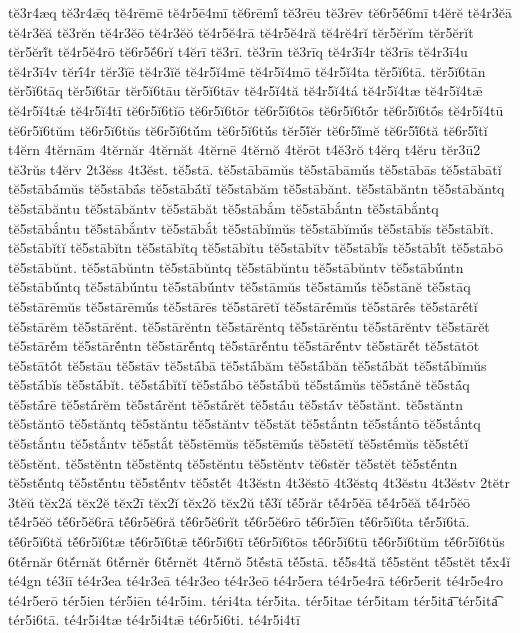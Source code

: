 {tĕ3r4æq
tĕ3r4ǣq
tĕ4rēmē
tĕ4r5ē4mī
tĕ6rēmĭ́
tĕ3rēu
tĕ3rēv
tĕ6r5ḗ6mī
t4ĕrĕ
tĕ4r3ĕā
tĕ4r3ĕă
tĕ3rĕn
tĕ4r3ĕō
tĕ4r3ĕŏ
tĕ4r5ĕ4rā
tĕ4r5ĕ4ră
tĕ4rĕ4rĭ
tĕr5ĕrĭm
tĕr5ĕrĭt
tĕr5ĕrĭ́t
tĕ4r5ĕ4rō
tĕ6r5ĕ́6rĭ
t4ĕrī
tĕ3rī.
tĕ3rīn
tĕ3rīq
tĕ4r3ī4r
tĕ3rīs
tĕ4r3ī4u
tĕ4r3ī4v
tĕrī́4r
tĕr3ĭē
tĕ4r3ĭĕ
tĕ4r5ĭ4mē
tĕ4r5ĭ4mō
tĕ4r5ĭ4ta
tĕr5ĭ6tā.
tĕr5ĭ6tān
tĕr5ĭ6tāq
tĕr5ĭ6tār
tĕr5ĭ6tāu
tĕr5ĭ6tāv
tĕ4r5ĭ4tă
tĕ4r5ĭ4tá
tĕ4r5ĭ4tæ
tĕ4r5ĭ4tǣ
tĕ4r5ĭ4tǽ
tĕ4r5ĭ4tī
tĕ6r5ĭ6tĭō
tĕ6r5ĭ6tōr
tĕ6r5ĭ6tōs
tĕ6r5ĭ6tṓr
tĕ6r5ĭ6tṓs
tĕ4r5ĭ4tū
tĕ6r5ĭ6tŭm
tĕ6r5ĭ6tŭs
tĕ6r5ĭ6tŭ́m
tĕ6r5ĭ6tŭ́s
tĕr5ĭ́ĕr
tĕ6r5ĭ́mĕ
tĕ6r5ĭ́6tă
tĕ6r5ĭ́tĭ
t4ĕrn
4tĕrnām
4tĕrnăr
4tĕrnăt
4tĕrnē
4tĕrnŏ
4tĕrōt
t4ĕ3rŏ
t4ĕrq
t4ĕru
tĕr3ū2
tĕ3rŭs
t4ĕrv
2t3ĕss
4t3ĕst.
tĕ5stā.
tĕ5stābāmŭs
tĕ5stābāmŭ́s
tĕ5stābās
tĕ5stābātĭ
tĕ5stābā́mŭs
tĕ5stābā́s
tĕ5stābā́tĭ
tĕ5stābăm
tĕ5stābănt.
tĕ5stābăntn
tĕ5stābăntq
tĕ5stābăntu
tĕ5stābăntv
tĕ5stābăt
tĕ5stābắm
tĕ5stābắntn
tĕ5stābắntq
tĕ5stābắntu
tĕ5stābắntv
tĕ5stābắt
tĕ5stābĭmŭs
tĕ5stābĭmŭ́s
tĕ5stābĭs
tĕ5stābĭt.
tĕ5stābĭtĭ
tĕ5stābĭtn
tĕ5stābĭtq
tĕ5stābĭtu
tĕ5stābĭtv
tĕ5stābĭ́s
tĕ5stābĭ́t
tĕ5stābō
tĕ5stābŭnt.
tĕ5stābŭntn
tĕ5stābŭntq
tĕ5stābŭntu
tĕ5stābŭntv
tĕ5stābŭ́ntn
tĕ5stābŭ́ntq
tĕ5stābŭ́ntu
tĕ5stābŭ́ntv
tĕ5stāmŭs
tĕ5stāmŭ́s
tĕ5stānĕ
tĕ5stāq
tĕ5stārēmŭs
tĕ5stārēmŭ́s
tĕ5stārēs
tĕ5stārētĭ
tĕ5stārḗmŭs
tĕ5stārḗs
tĕ5stārḗtĭ
tĕ5stārĕm
tĕ5stārĕnt.
tĕ5stārĕntn
tĕ5stārĕntq
tĕ5stārĕntu
tĕ5stārĕntv
tĕ5stārĕt
tĕ5stārĕ́m
tĕ5stārĕ́ntn
tĕ5stārĕ́ntq
tĕ5stārĕ́ntu
tĕ5stārĕ́ntv
tĕ5stārĕ́t
tĕ5stātōt
tĕ5stātṓt
tĕ5stāu
tĕ5stāv
tĕ5stā́bā
tĕ5stā́băm
tĕ5stā́băn
tĕ5stā́băt
tĕ5stā́bĭmŭs
tĕ5stā́bĭs
tĕ5stā́bĭt.
tĕ5stā́bĭtĭ
tĕ5stā́bō
tĕ5stā́bŭ
tĕ5stā́mŭs
tĕ5stā́nĕ
tĕ5stā́q
tĕ5stā́rē
tĕ5stā́rĕm
tĕ5stā́rĕnt
tĕ5stā́rĕt
tĕ5stā́u
tĕ5stā́v
tĕ5stănt.
tĕ5stăntn
tĕ5stăntō
tĕ5stăntq
tĕ5stăntu
tĕ5stăntv
tĕ5stăt
tĕ5stắntn
tĕ5stắntō
tĕ5stắntq
tĕ5stắntu
tĕ5stắntv
tĕ5stắt
tĕ5stēmŭs
tĕ5stēmŭ́s
tĕ5stētĭ
tĕ5stḗmŭs
tĕ5stḗtĭ
tĕ5stĕnt.
tĕ5stĕntn
tĕ5stĕntq
tĕ5stĕntu
tĕ5stĕntv
tĕ6stĕr
tĕ5stĕt
tĕ5stĕ́ntn
tĕ5stĕ́ntq
tĕ5stĕ́ntu
tĕ5stĕ́ntv
tĕ5stĕ́t
4t3ĕstn
4t3ĕstō
4t3ĕstq
4t3ĕstu
4t3ĕstv
2tĕtr
3tĕŭ
tĕx2ă
tĕx2ĕ
tĕx2ī
tĕx2ĭ
tĕx2ŏ
tĕx2ŭ
tĕ́3ĭ
tĕ́5răr
tĕ́4r5ĕā
tĕ́4r5ĕă
tĕ́4r5ĕō
tĕ́4r5ĕŏ
tĕ́6r5ĕ6rā
tĕ́6r5ĕ6ră
tĕ́6r5ĕ6rĭt
tĕ́6r5ĕ6rō
tĕ́6r5ĭēn
tĕ́6r5ĭ6ta
tĕ́r5ĭ6tā.
tĕ́6r5ĭ6tă
tĕ́6r5ĭ6tæ
tĕ́6r5ĭ6tǣ
tĕ́6r5ĭ6tī
tĕ́6r5ĭ6tōs
tĕ́6r5ĭ6tū
tĕ́6r5ĭ6tŭm
tĕ́6r5ĭ6tŭs
6tĕ́rnăr
6tĕ́rnăt
6tĕ́rnĕr
6tĕ́rnĕt
4tĕ́rnŏ
5tĕ́stā
tĕ́5stā.
tĕ́5s4tă
tĕ́5stĕnt
tĕ́5stĕt
tĕ́x4ĭ
té4gn
té3iī
té4r3ea
té4r3eā
té4r3eo
té4r3eō
té4r5era
té4r5e4rā
té6r5erit
té4r5e4ro
té4r5erō
tér5ien
tér5iēn
té4r5im.
téri4ta
tér5ita.
tér5itae
tér5itam
tér5ita͞
tér5ita͡
tér5i6tā.
té4r5i4tæ
té4r5i4tǣ
té6r5i6ti.
té4r5i4tī
}
